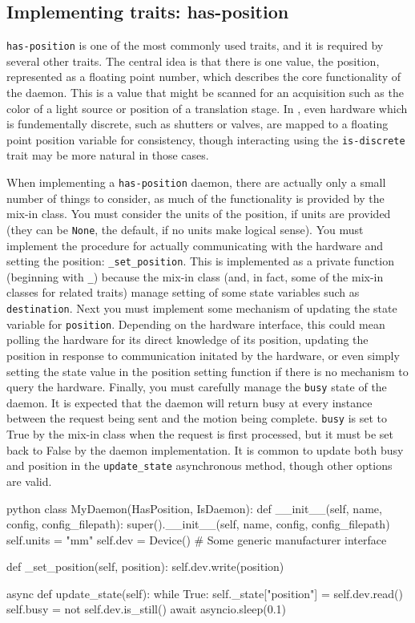 \subsection{Implementing traits: has-position}

\texttt{has-position} is one of the most commonly used traits, and it is required by several other traits.
The central idea is that there is one value, the position, represented as a floating point number, which describes the core functionality of the daemon.
This is a value that might be scanned for an acquisition such as the color of a light source or position of a translation stage.
In \yaq{}, even hardware which is fundementally discrete, such as shutters or valves, are mapped to a floating point position variable for consistency, though interacting using the \texttt{is-discrete} trait may be more natural in those cases.

When implementing a \texttt{has-position} daemon, there are actually only a small number of things to consider, as much of the functionality is provided by the mix-in class.
You must consider the units of the position, if units are provided (they can be \texttt{None}, the default, if no units make logical sense).
You must implement the procedure for actually communicating with the hardware and setting the position: \texttt{\_set\_position}.
This is implemented as a private function (beginning with \texttt{\_}) because the mix-in class (and, in fact, some of the mix-in classes for related traits) manage setting of some state variables such as \texttt{destination}.
Next you must implement some mechanism of updating the state variable for \texttt{position}.
Depending on the hardware interface, this could mean polling the hardware for its direct knowledge of its position, updating the position in response to communication initated by the hardware, or even simply setting the state value in the position setting function if there is no mechanism to query the hardware.
Finally, you must carefully manage the \texttt{busy} state of the daemon.
It is expected that the daemon will return busy at every instance between the request being sent and the motion being complete.
\texttt{busy} is set to True by the mix-in class when the request is first processed, but it must be set back to False by the daemon implementation.
It is common to update both busy and position in the \texttt{update\_state} asynchronous method, though other options are valid.

\begin{codefragment}{python}
class MyDaemon(HasPosition, IsDaemon):
    def __init__(self, name, config, config_filepath):
        super().__init__(self, name, config, config_filepath)
        self.units = "mm"
        self.dev = Device() # Some generic manufacturer interface
    
    def _set_position(self, position):
        self.dev.write(position)

    async def update_state(self):
        while True:
            self._state["position"] = self.dev.read()
            self.busy = not self.dev.is_still()
            await asyncio.sleep(0.1)
\end{codefragment}

